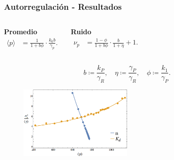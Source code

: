 \documentclass{beamer}
\begin{document}
\begin{frame}
\frametitle{Autorregulaci\'on - Resultados}
\begin{columns}[c]

\centering \textbf{Promedio}
\begin{align*}
\langle p \rangle &= \frac{1}{1+b\phi} \cdot \frac{k_0b}{\gamma_p}.
\end{align*}

\centering \textbf{Ruido}
\begin{align*}
\nu_p &= \frac{1-\phi}{1+b\phi} \cdot \frac{b}{1+\eta}+1.
\end{align*}
\end{columns}

\vspace{3 mm}

\begin{equation*}
  b \coloneqq \frac{k_P}{\gamma_R}, \quad \eta \coloneqq \frac{\gamma_P}{\gamma_R}, \quad \phi \coloneqq \frac{k_1}{\gamma_P}.
\end{equation*}

\begin{figure}[p]
    \centering
    \includegraphics[width=0.5\textwidth]{mas-sim_autorreg.png}\\
\end{figure}


\end{frame}
\end{document}
